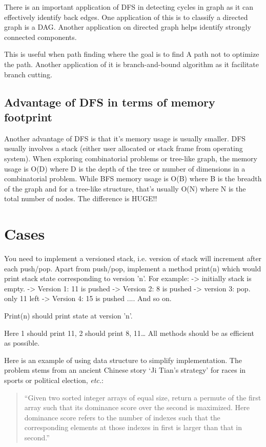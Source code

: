 There is an important application of DFS in detecting cycles in graph as it can effectively
identify back edges.
One application of this is to classify a directed graph is a DAG.
Another application on directed graph helps identify strongly connected components.

This is useful when path finding where the goal is to find A path not to optimize the path.
Another application of it is branch-and-bound algorithm as it facilitate branch cutting.


\subsection{Advantage of DFS in terms of memory footprint}

Another advantage of DFS is that it's memory usage is usually smaller.
DFS usually involves a stack (either user allocated or stack frame from operating system).
When exploring combinatorial problems or tree-like graph, the memory usage is O(D) where D is the
depth of the tree or number of dimensions in a combinatorial problem.
While BFS memory usage is O(B) where B is the breadth of the graph and for a tree-like structure,
that's usually O(N) where N is the total number of nodes.
The difference is HUGE!!

\section{Cases}

\label{Evernote:Versioned Stack algorithm}
You need to implement a versioned stack, i.e. version of stack will increment after each push/pop. Apart from push/pop, implement a method print(n) which would print stack state corresponding to version 'n'. For example:
-> initially stack is empty.
-> Version 1: 11 is pushed
-> Version 2: 8 is pushed
-> version 3: pop. only 11 left
-> Version 4: 15 is pushed
....
And so on.

Print(n) should print state at version 'n'.

Here 1 should print 11, 2 should print 8, 11\ldots
All methods should be as efficient as possible.



Here is an example of using  data structure to simplify implementation.
The problem stems from an ancient Chinese story `Ji Tian's strategy' for races in sports or
political election,
\textit{etc.}:
\begin{quote}
    ``Given two sorted integer arrays of equal size, return a permute of the first array
    such that its dominance score over the second is maximized.
    Here dominance score refers to the number of indexes such that the corresponding elements at
    those indexes in first is larger than that in second.''
\end{quote}



